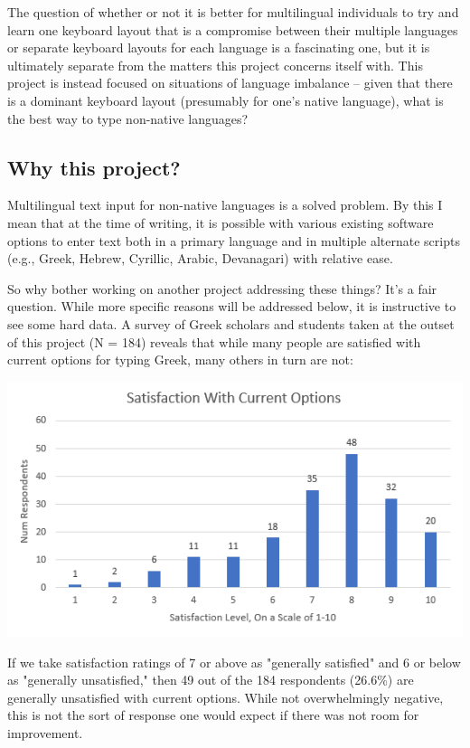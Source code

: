 \documentclass[11pt]{article}
\begin{document}
The question of whether or not it is better for multilingual individuals to try and learn one keyboard layout that is a compromise between their multiple languages or separate keyboard layouts for each language is a fascinating one, but it is ultimately separate from the matters this project concerns itself with. This project is instead focused on situations of language imbalance -- given that there is a dominant keyboard layout (presumably for one's native language), what is the best way to type non-native languages?

\subsection{Why this project?}
\label{sec:org4d8a253}

Multilingual text input for non-native languages is a solved problem. By this I mean that at the time of writing, it is possible with various existing software options to enter text both in a primary language and in multiple alternate scripts (e.g., Greek, Hebrew, Cyrillic, Arabic, Devanagari) with relative ease.

So why bother working on another project addressing these things? It's a fair question. While more specific reasons will be addressed below, it is instructive to see some hard data. A survey of Greek scholars and students taken at the outset of this project (N = 184) reveals that while many people are satisfied with current options for typing Greek, many others in turn are not:

\begin{center}
\includegraphics[width=.9\linewidth]{./images/satisfaction.PNG}
\end{center}

If we take satisfaction ratings of 7 or above as "generally satisfied" and 6 or below as "generally unsatisfied," then 49 out of the 184 respondents (26.6\%) are generally unsatisfied with current options. While not overwhelmingly negative, this is not the sort of response one would expect if there was not room for improvement.
\end{document}
